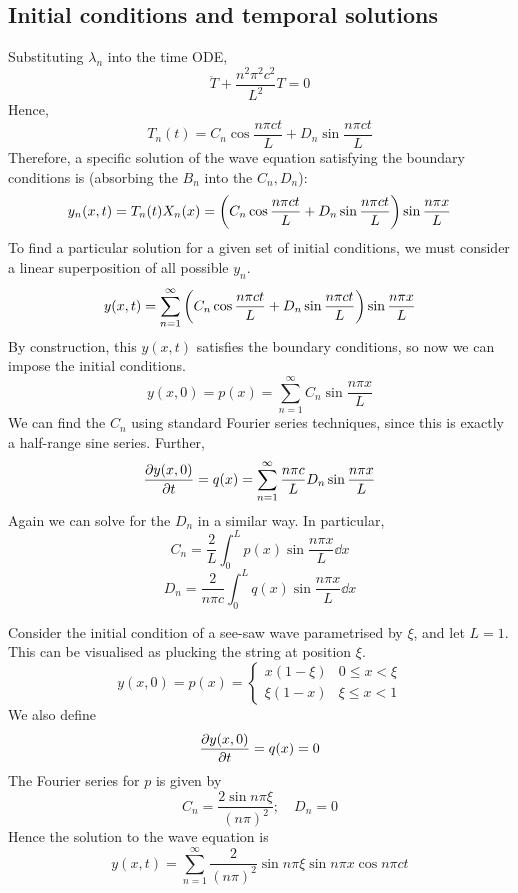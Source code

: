 \subsection{Initial conditions and temporal solutions}
Substituting \( \lambda_n \) into the time ODE,
\[
	\ddot T + \frac{n^2 \pi^2 c^2}{L^2}T = 0
\]
Hence,
\[
	T_n(t) = C_n \cos \frac{n \pi c t}{L} + D_n \sin \frac{n \pi c t}{L}
\]
Therefore, a specific solution of the wave equation satisfying the boundary conditions is (absorbing the \( B_n \) into the \( C_n, D_n \)):
\[
	y_n(x,t) = T_n(t) X_n(x) = \qty(C_n \cos \frac{n \pi c t}{L} + D_n \sin \frac{n \pi c t}{L}) \sin \frac{n \pi x}{L}
\]
To find a particular solution for a given set of initial conditions, we must consider a linear superposition of all possible \( y_n \).
\[
	y(x,t) = \sum_{n=1}^\infty \qty(C_n \cos \frac{n \pi c t}{L} + D_n \sin \frac{n \pi c t}{L}) \sin \frac{n \pi x}{L}
\]
By construction, this \( y(x,t) \) satisfies the boundary conditions, so now we can impose the initial conditions.
\[
	y(x,0) = p(x) = \sum_{n=1}^\infty C_n \sin \frac{n \pi x}{L}
\]
We can find the \( C_n \) using standard Fourier series techniques, since this is exactly a half-range sine series.
Further,
\[
	\pdv{y(x,0)}{t} = q(x) = \sum_{n=1}^\infty \frac{n \pi c}{L} D_n \sin \frac{n \pi x}{L}
\]
Again we can solve for the \( D_n \) in a similar way.
In particular,
\[
	C_n = \frac{2}{L} \int_0^L p(x) \sin \frac{n \pi x}{L} \dd{x}
\]
\[
	D_n = \frac{2}{n \pi c} \int_0^L q(x) \sin \frac{n \pi x}{L} \dd{x}
\]
\begin{example}
	Consider the initial condition of a see-saw wave parametrised by \( \xi \), and let \( L = 1 \).
	This can be visualised as plucking the string at position \( \xi \).
	\[
		y(x,0) = p(x) = \begin{cases}
			x(1-\xi) & 0 \leq x < \xi \\
			\xi(1-x) & \xi \leq x < 1
		\end{cases}
	\]
	We also define
	\[
		\pdv{y(x,0)}{t} = q(x) = 0
	\]
	The Fourier series for \( p \) is given by
	\[
		C_n = \frac{2 \sin n \pi \xi}{(n \pi)^2};\quad D_n = 0
	\]
	Hence the solution to the wave equation is
	\[
		y(x,t) = \sum_{n=1}^\infty \frac{2}{(n \pi)^2} \sin n \pi \xi \sin n \pi x \cos n \pi c t
	\]
\end{example}

